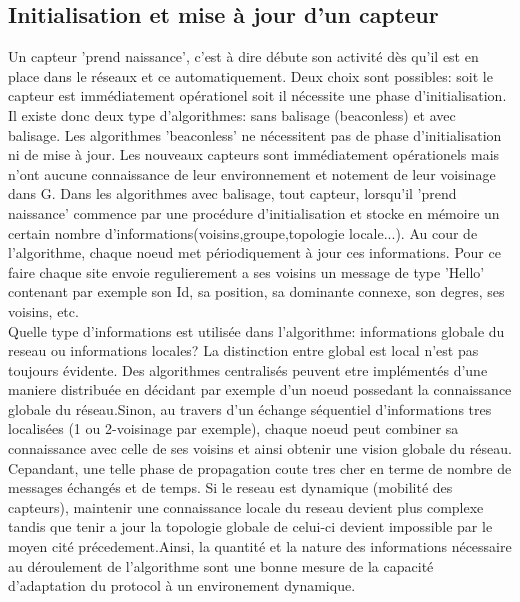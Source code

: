 \subsection{Initialisation et mise à jour d'un capteur}
Un capteur 'prend naissance', c'est à dire débute son activité dès qu'il est en place dans le réseaux et ce automatiquement. Deux choix sont possibles: soit le capteur est immédiatement opérationel soit il nécessite une phase 
d'initialisation. Il existe donc deux type d'algorithmes: sans balisage (beaconless) et avec balisage. Les algorithmes 'beaconless' ne nécessitent pas de phase d'initialisation ni de mise à jour. Les nouveaux capteurs sont immédiatement 
opérationels mais n'ont aucune connaissance de leur environnement et notement de leur voisinage dans G. Dans les algorithmes avec balisage, tout capteur, lorsqu'il 'prend naissance' commence par une procédure d'initialisation et stocke en 
mémoire un certain nombre d'informations(voisins,groupe,topologie locale...). Au cour de l'algorithme, chaque noeud met périodiquement à jour ces informations. Pour ce faire chaque site envoie regulierement a ses voisins un message de type
'Hello' contenant par exemple son Id, sa position, sa dominante connexe, son degres, ses voisins, etc.\\
 

Quelle type d'informations est utilisée dans l'algorithme: informations globale du reseau ou informations locales? La distinction entre global est local n'est pas toujours évidente. Des algorithmes centralisés peuvent etre implémentés
 d'une maniere distribuée en décidant par exemple d'un noeud possedant la connaissance globale du réseau.Sinon, au travers d'un échange séquentiel d'informations tres localisées (1 ou 2-voisinage par exemple), chaque noeud peut combiner sa 
connaissance avec celle de ses voisins et ainsi obtenir une vision globale du réseau. Cepandant, une telle phase de propagation coute tres cher en terme de nombre de messages échangés et de temps.
Si le reseau est dynamique (mobilité des capteurs), maintenir une connaissance locale du reseau devient plus complexe tandis que tenir a jour la topologie globale de celui-ci devient impossible par le moyen cité précedement.Ainsi, 
la quantité et la nature des informations nécessaire au déroulement de l'algorithme sont une bonne mesure de la capacité d'adaptation du protocol à un environement dynamique.   

